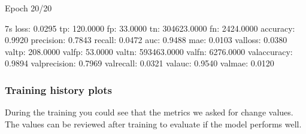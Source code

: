 \documentclass[letterpaper,10pt,english]{sphinxmanual}
\begin{document}
\begin{sphinxVerbatim}[commandchars=\\\{\}]
Epoch 20/20
\end{sphinxVerbatim}

\begin{sphinxVerbatim}[commandchars=\\\{\}]
 \PYGZhy{} 7s \PYGZhy{} loss: 0.0295 \PYGZhy{} tp: 120.0000 \PYGZhy{} fp: 33.0000 \PYGZhy{} tn: 304623.0000 \PYGZhy{} fn: 2424.0000 \PYGZhy{} accuracy: 0.9920 \PYGZhy{} precision: 0.7843 \PYGZhy{} recall: 0.0472 \PYGZhy{} auc: 0.9488 \PYGZhy{} mae: 0.0103 \PYGZhy{} val\PYGZus{}loss: 0.0380 \PYGZhy{} val\PYGZus{}tp: 208.0000 \PYGZhy{} val\PYGZus{}fp: 53.0000 \PYGZhy{} val\PYGZus{}tn: 593463.0000 \PYGZhy{} val\PYGZus{}fn: 6276.0000 \PYGZhy{} val\PYGZus{}accuracy: 0.9894 \PYGZhy{} val\PYGZus{}precision: 0.7969 \PYGZhy{} val\PYGZus{}recall: 0.0321 \PYGZhy{} val\PYGZus{}auc: 0.9540 \PYGZhy{} val\PYGZus{}mae: 0.0120
\end{sphinxVerbatim}


\subsubsection{Training history plots}
\label{\detokenize{ML4NeutronImageSegmentation:training-history-plots}}
During the training you could see that the metrics we asked for change values. The values can be reviewed after training to evaluate if the model performs well.
\end{document}
